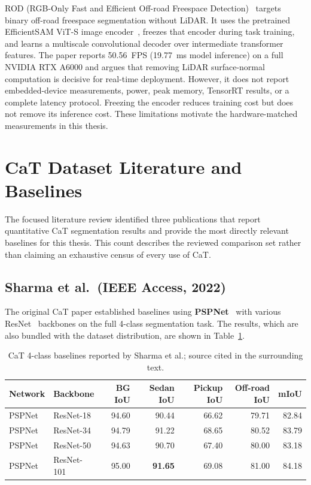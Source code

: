 \documentclass[12pt,a4paper]{report}
\begin{document}
ROD (RGB-Only Fast and Efficient Off-road Freespace Detection)~\cite{sun2025rod}
targets binary off-road freespace segmentation without LiDAR. It uses the
pretrained EfficientSAM ViT-S image encoder~\cite{xiong2024efficientsam}, freezes
that encoder during task training, and learns a multiscale convolutional decoder
over intermediate transformer features. The paper reports 50.56~FPS
(19.77~ms model inference) on a full NVIDIA RTX A6000 and argues that removing
LiDAR surface-normal computation is decisive for real-time deployment. However,
it does not report embedded-device measurements, power, peak memory, TensorRT
results, or a complete latency protocol. Freezing the encoder reduces training
cost but does not remove its inference cost. These limitations motivate the
hardware-matched measurements in this thesis.

\section{CaT Dataset Literature and Baselines}
\label{sec:cat_literature}

The focused literature review identified three publications that report
quantitative CaT segmentation results and provide the most directly relevant
baselines for this thesis. This count describes the reviewed comparison set
rather than claiming an exhaustive census of every use of CaT.

\subsection{Sharma et al.\ (IEEE Access, 2022)}

The original CaT paper established baselines using \textbf{PSPNet}~\cite{zhao2017pspnet}
with various ResNet~\cite{he2016resnet} backbones on the full 4-class segmentation task.
The results, which are also bundled with the dataset distribution, are shown in Table~\ref{tab:cat_baselines}.

\begin{table}[H]
\centering
\caption{CaT 4-class baselines reported by Sharma et al.; source cited in the surrounding text.}
\label{tab:cat_baselines}
\small
\begin{tabular}{@{}llrrrr r@{}}
\toprule
\textbf{Network} & \textbf{Backbone} & \textbf{BG IoU} & \textbf{Sedan IoU} & \textbf{Pickup IoU} & \textbf{Off-road IoU} & \textbf{mIoU} \\
\midrule
PSPNet & ResNet-18  & 94.60 & 90.44 & 66.62 & 79.71 & 82.84 \\
PSPNet & ResNet-34  & 94.79 & 91.22 & 68.65 & 80.52 & 83.79 \\
PSPNet & ResNet-50  & 94.63 & 90.70 & 67.40 & 80.00 & 83.18 \\
PSPNet & ResNet-101 & 95.00 & \textbf{91.65} & 69.08 & 81.00 & 84.18 \\
\bottomrule
\end{tabular}
\end{table}
\end{document}
